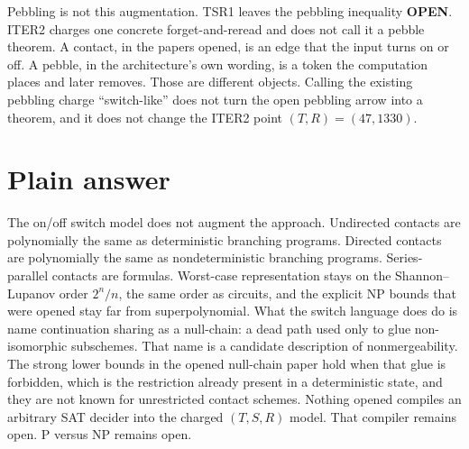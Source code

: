 \documentclass[11pt]{article}
\begin{document}
Pebbling is not this augmentation.
TSR1 leaves the pebbling inequality \textbf{OPEN}.
ITER2 charges one concrete forget-and-reread and does not call it a pebble theorem.
A contact, in the papers opened, is an edge that the input turns on or off.
A pebble, in the architecture's own wording, is a token the computation places and later removes.
Those are different objects.
Calling the existing pebbling charge ``switch-like'' does not turn the open pebbling arrow into a theorem, and it does not change the ITER2 point \((T,R)=(47,1330)\).

\section{Plain answer}
The on/off switch model does not augment the approach.
Undirected contacts are polynomially the same as deterministic branching programs.
Directed contacts are polynomially the same as nondeterministic branching programs.
Series-parallel contacts are formulas.
Worst-case representation stays on the Shannon--Lupanov order \(2^n/n\), the same order as circuits, and the explicit NP bounds that were opened stay far from superpolynomial.
What the switch language does do is name continuation sharing as a null-chain: a dead path used only to glue non-isomorphic subschemes.
That name is a candidate description of nonmergeability.
The strong lower bounds in the opened null-chain paper hold when that glue is forbidden, which is the restriction already present in a deterministic state, and they are not known for unrestricted contact schemes.
Nothing opened compiles an arbitrary SAT decider into the charged \((T,S,R)\) model.
That compiler remains open.
P versus NP remains open.
\end{document}
